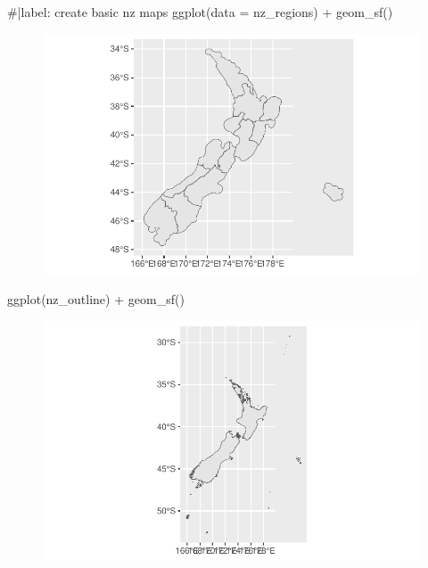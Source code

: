 \documentclass[
  letterpaper,
  DIV=11,
  numbers=noendperiod]{scrartcl}
\newenvironment{Shaded}{\begin{snugshade}}{\end{snugshade}}
\newcommand{\AttributeTok}[1]{\textcolor[rgb]{0.40,0.45,0.13}{#1}}
\newcommand{\CommentTok}[1]{\textcolor[rgb]{0.37,0.37,0.37}{#1}}
\newcommand{\FunctionTok}[1]{\textcolor[rgb]{0.28,0.35,0.67}{#1}}
\newcommand{\NormalTok}[1]{\textcolor[rgb]{0.00,0.23,0.31}{#1}}
\newcommand{\SpecialCharTok}[1]{\textcolor[rgb]{0.37,0.37,0.37}{#1}}
\begin{document}
\begin{Shaded}
\begin{Highlighting}[]
\CommentTok{\#|label: create basic nz maps}
\FunctionTok{ggplot}\NormalTok{(}\AttributeTok{data =}\NormalTok{ nz\_regions) }\SpecialCharTok{+}
  \FunctionTok{geom\_sf}\NormalTok{()}
\end{Highlighting}
\end{Shaded}

\begin{figure}[H]

{\centering \includegraphics{Introduction-to-mapping_files/figure-pdf/unnamed-chunk-19-1.pdf}

}

\end{figure}

\begin{Shaded}
\begin{Highlighting}[]
\FunctionTok{ggplot}\NormalTok{(nz\_outline) }\SpecialCharTok{+}
  \FunctionTok{geom\_sf}\NormalTok{()}
\end{Highlighting}
\end{Shaded}

\begin{figure}[H]

{\centering \includegraphics{Introduction-to-mapping_files/figure-pdf/unnamed-chunk-19-2.pdf}

}

\end{figure}
\end{document}
